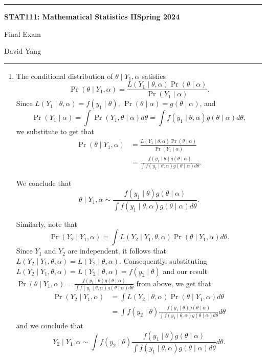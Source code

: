 \documentclass[11pt]{article}
\begin{document}
	\hrule
	\begin{center}
        \textbf{STAT111: Mathematical Statistics II}\hfill \textbf{Spring 2024}\newline

		{\Large Final Exam}

		David Yang
	\end{center}

\hrule

\vspace{1em}

\begin{enumerate}
\item 
    The conditional distribution of $\theta \mid Y_1, \alpha$ satisfies
    \[
        \Pr(\theta \mid Y_1, \alpha) = \frac{L(Y_1 \mid \theta, \alpha) \Pr(\theta \mid \alpha)}{\Pr(Y_1 \mid \alpha)}.
    \]
    Since $L(Y_1 \mid \theta, \alpha) = f(y_1 \mid \theta)$, $\Pr(\theta \mid \alpha) = g(\theta \mid \alpha)$, and 
    \[
        \Pr(Y_1 \mid \alpha) = \int \Pr(Y_1 , \theta \mid  \alpha) d\theta = \int f(y_1 \mid \theta, \alpha) g(\theta \mid \alpha) d\theta,
    \]
    we substitute to get that
    \begin{align*}
        \Pr(\theta \mid Y_1, \alpha) &= \frac{L(Y_1 \mid \theta, \alpha) \Pr(\theta \mid \alpha)}{\Pr(Y_1 \mid \alpha)} \\
        &= \frac{f(y_1 \mid \theta) g(\theta \mid \alpha)}{\int f(y_1 \mid \theta, \alpha) g(\theta \mid \alpha) d\theta}.
    \end{align*}

    We conclude that 
    \[
        \boxed{\theta \mid Y_1, \alpha \sim \frac{f(y_1 \mid \theta) g(\theta \mid \alpha)}{\int f(y_1 \mid \theta, \alpha) g(\theta \mid \alpha) d\theta}}.
    \]

    Similarly, note that
    \[
        \Pr(Y_2 \mid Y_1, \alpha) = \int L(Y_2 \mid Y_1, \theta, \alpha) \Pr (\theta \mid Y_1, \alpha) d\theta.
    \]
    Since $Y_1$ and $Y_2$ are independent, it follows that $L(Y_2 \mid Y_1, \theta, \alpha) = L(Y_2 \mid \theta, \alpha)$. Consequently,
    substituting $L(Y_2 \mid Y_1, \theta, \alpha) = L(Y_2 \mid \theta, \alpha) = f(y_2 \mid \theta)$ and our result $\Pr (\theta \mid Y_1, \alpha) = \frac{f(y_1 \mid \theta) g(\theta \mid \alpha)}{\int f(y_1 \mid \theta, \alpha) g(\theta \mid \alpha) d\theta}$ from above, we get that
    \begin{align*}
        \Pr(Y_2 \mid Y_1, \alpha) &= \int L(Y_2 \mid \theta, \alpha) \Pr (\theta \mid Y_1, \alpha) d\theta \\
        &= \int f(y_2 \mid \theta) \frac{f(y_1 \mid \theta) g(\theta \mid \alpha)}{\int f(y_1 \mid \theta, \alpha) g(\theta \mid \alpha) d\theta} d\theta
    \end{align*}
    and we conclude that
    \[
        \boxed{Y_2 \mid Y_1, \alpha \sim \int f(y_2 \mid \theta) \frac{f(y_1 \mid \theta) g(\theta \mid \alpha)}{\int f(y_1 \mid \theta, \alpha) g(\theta \mid \alpha) d\theta} d\theta}.
    \]


\end{enumerate}
\end{document}
